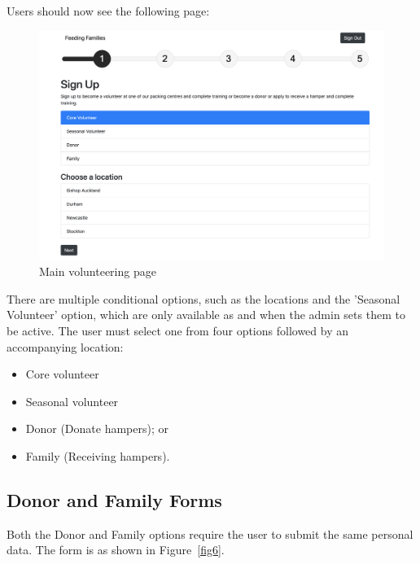\documentclass[12pt]{article}
\begin{document}
Users should now see the following page:

\begin{figure}[h]
    \centering
    \hspace*{-2cm}\includegraphics[scale=0.3]{main/main.png}
    \caption{Main volunteering page}
    \label{fig5}
\end{figure}

There are multiple conditional options, such as the locations and the 'Seasonal Volunteer' option, which are only available as and when the admin sets them to be active. The user must select one from four options followed by an accompanying location:

\begin{itemize}
   \item Core volunteer 
    \item Seasonal volunteer 
   \item Donor (Donate hampers); or
   \item Family (Receiving hampers).
   
\end{itemize}

\newpage
\subsection{Donor and Family Forms}
Both the Donor and Family options require the user to submit the same personal data. The form is as shown in Figure~\ref{fig6}.
\end{document}
